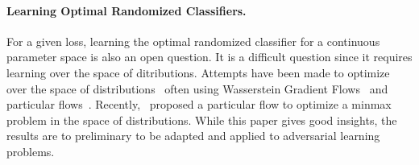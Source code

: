 \paragraph{Learning Optimal Randomized Classifiers.} For a given loss, learning the optimal randomized classifier for a continuous parameter space is also an open question.  It is a difficult question since it requires learning over the space of ditributions. Attempts have been made to optimize over the space of distributions~\citep{chizat2021sparse,chizat2021convergence,kent2021frank} often using Wasserstein Gradient Flows~\citep{ambrosio2005gradient} and particular flows~\citep{wibisono2018sampling}. Recently,~\citet{domingo2020mean} proposed a particular flow to optimize a minmax problem in the space of distributions. While this paper gives good insights, the results are to preliminary to be adapted and applied to adversarial learning problems.


